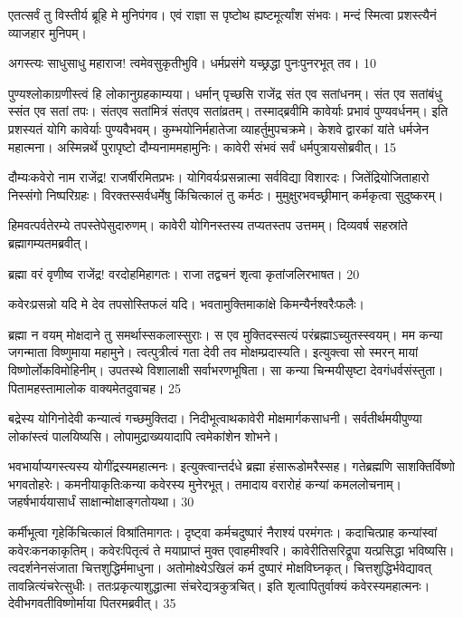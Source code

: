 एतत्सर्वं तु विस्तीर्य ब्रूहि मे मुनिपंगव।
एवं राज्ञा स पृष्टोथ ह्यष्टमूर्त्यांश संभवः।
मन्दं स्मित्वा प्रशस्त्यैनं व्याजहार मुनिपम्।

अगस्त्यः
साधुसाधु महाराज! त्वमेवसुकृतीभुवि।
धर्मप्रसंगे यच्छ्रद्धा पुनःपुनरभूत् तव।
10

पुण्यश्लोकाग्रणीस्त्वं हि लोकानुग्रहकाम्यया।
धर्मान् पृच्छसि राजेंद्र संत एव सतांधनम्।
संत एव सतांबंधु स्संत एव सतां तपः।
संतएव सतांमित्रं संतएव सतांव्रतम्।
तस्माद्ब्रवीमि कावेर्याः प्रभावं पुण्यवर्धनम्।
इति प्रशस्यतं योगि कावेर्याः पुण्यवैभवम्।
कुम्भयोनिर्महातेजा व्याहर्तुमुपचक्रमे।
केशवे द्वारकां यांते धर्मजेन महात्मना।
अस्मिन्नर्थे पुरापृष्टो दौम्यनाममहामुनिः।
कावेरी संभवं सर्वं धर्मपुत्रायसोब्रवीत्।
15

दौम्यःकवेरो नाम राजेंद्र! राजर्षीरमितप्रभः।
योगिवर्यःप्रसन्नात्मा सर्वविद्या विशारदः।
जितेंद्रियोजिताहारो निस्संगो निष्परिग्रहः।
विरक्तस्सर्वधर्मेषु किंचित्कालं तु कर्मठः।
मुमुक्षुरभवच्छ्रीमान् कर्मकृत्वा सुदुष्करम्।

हिमवत्पर्वतेरम्ये तपस्तेपेसुदारुणम्।
कावेरी योगिनस्तस्य तप्यतस्तप उत्तमम्।
दिव्यवर्ष सहस्रांते ब्रह्मागम्यतमब्रवीत्।

ब्रह्मा
वरं वृणीष्व राजेंद्र! वरदोहमिहागतः।
राजा तद्वचनं शृत्वा कृतांजलिरभाषत।
20

कवेरःप्रसन्नो यदि मे देव तपसोस्तिफलं यदि।
भवतामुक्तिमाकांक्षे किमन्यैर्नश्वरैःफलैः।

ब्रह्मा
न वयम् मोक्षदाने तु समर्थास्सकलास्सुराः।
स एव मुक्तिदस्सत्यं परंब्रह्माऽच्युतस्स्वयम्।
मम कन्या जगन्माता विष्णुमाया महामुने।
त्वत्पुत्रीत्वं गता देवी तव मोक्षम्प्रदास्यति।
इत्युक्त्वा सो स्मरन् मायां विष्णोर्लोकविमोहिनीम्।
उपतस्थे विशालाक्षी सर्वाभरणभूषिता।
सा कन्या चिन्मयीसृष्टा देवगंधर्वसंस्तुता।
पितामहस्तामालोक वाक्यमेतदुवाचह।
25

बद्रेस्य योगिनोदेवी कन्यात्वं गच्छमुक्तिदा।
निदीभूत्वाथकावेरी मोक्षमार्गकसाधनी।
सर्वतीर्थमयीपुण्या लोकांस्त्वं पालयिष्यसि।
लोपामुद्राख्ययादापि त्वमेकांशेन शोभने।

भवभार्याप्यगस्त्यस्य योगींद्रस्यमहात्मनः।
इत्युक्त्वान्तर्दधे ब्रह्मा हंसारूडोमरैस्सह।
गतेब्रह्मणि साशक्तिर्विष्णो भगवतोहरेः।
कमनीयाकृतिःकन्या कवेरस्य मुनेरभूत्।
तमादाय वरारोहं कन्यां कमललोचनाम्।
जहर्षभार्ययासार्धं साक्षान्मोक्षाङ्गतोयथा।
30

कर्मीभूत्वा गृहेकिंचित्कालं विश्रांतिमागतः।
दृष्ट्वा कर्मचदुष्पारं नैराश्यं परमंगतः।
कदाचित्प्राह कन्यांस्वां कवेरःकनकाकृतिम्।
कवेरःपितृत्वं ते मयाप्राप्तं मुक्त एवाहमीश्वरि।
कावेरीतिसरिद्रूपा यत्प्रसिद्धा भविष्यसि।
त्वदर्शनेनसंजाता चित्तशुद्धिर्ममाधुना।
अतोमोक्ष्येऽखिलं कर्म दुष्पारं मोक्षविघ्नकृत्।
चित्तशुद्धिर्भवेद्यावत् तावन्नित्यंचरेत्सुधीः।
ततःप्रकृत्याशुद्धात्मा संचरेद्यत्रकुत्रचित्।
इति शृत्वापितुर्वाक्यं कवेरस्यमहात्मनः।
देवीभगवतीविष्णोर्माया पितरमब्रवीत्।
35

